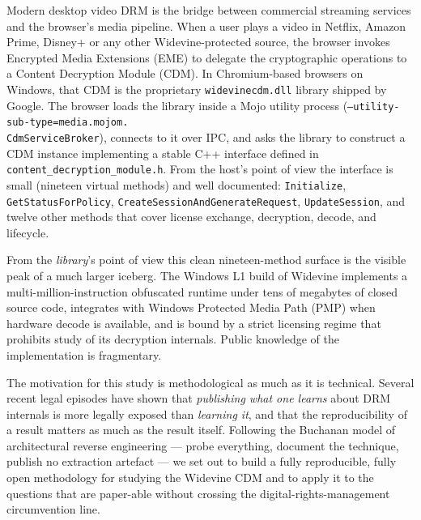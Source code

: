 \documentclass[11pt,letterpaper]{article}
\begin{document}
Modern desktop video DRM is the bridge between commercial streaming
services and the browser's media pipeline.  When a user plays a video
in Netflix, Amazon Prime, Disney+ or any other Widevine-protected
source, the browser invokes Encrypted Media Extensions (EME) to
delegate the cryptographic operations to a Content Decryption Module
(CDM).  In Chromium-based browsers on Windows, that CDM is the
proprietary \texttt{widevinecdm.dll} library shipped by Google.
The browser loads the library inside a Mojo utility process
(\texttt{--utility-sub-type=media.mojom.\\CdmServiceBroker}), connects
to it over IPC, and asks the library to construct a CDM instance
implementing a stable C++ interface defined in
\texttt{content\_decryption\_module.h}.  From the host's point of view
the interface is small (nineteen virtual methods) and well documented:
\texttt{Initialize}, \texttt{GetStatusForPolicy},
\texttt{CreateSessionAndGenerateRequest},
\texttt{UpdateSession}, and twelve other methods that cover license
exchange, decryption, decode, and lifecycle.

From the \emph{library}'s point of view this clean nineteen-method
surface is the visible peak of a much larger iceberg.  The Windows L1
build of Widevine implements a multi-million-instruction obfuscated
runtime under tens of megabytes of closed source code, integrates
with Windows Protected Media Path (PMP) when hardware decode is
available, and is bound by a strict licensing regime that prohibits
study of its decryption internals.  Public knowledge of the
implementation is fragmentary.

The motivation for this study is methodological as much as it is
technical.  Several recent legal episodes have shown that
\emph{publishing what one learns} about DRM internals is more legally
exposed than \emph{learning it}, and that the reproducibility of a
result matters as much as the result itself.  Following the Buchanan
model of architectural reverse engineering --- probe everything,
document the technique, publish no extraction artefact --- we set out
to build a fully reproducible, fully open methodology for studying
the Widevine CDM and to apply it to the questions that are paper-able
without crossing the digital-rights-management circumvention line.
\end{document}
